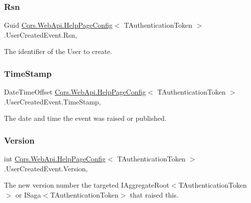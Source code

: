 \subsubsection{\texorpdfstring{Rsn}{Rsn}}
{\footnotesize\ttfamily Guid \hyperlink{classCqrs_1_1WebApi_1_1HelpPageConfig}{Cqrs.\+Web\+Api.\+Help\+Page\+Config}$<$ T\+Authentication\+Token $>$.User\+Created\+Event.\+Rsn\hspace{0.3cm}{\ttfamily [get]}, {\ttfamily [set]}}



The identifier of the User to create. 

\mbox{\label{classCqrs_1_1WebApi_1_1HelpPageConfig_1_1UserCreatedEvent_a413c824200dd34f9a0329641fbea731d_a413c824200dd34f9a0329641fbea731d}} 
\subsubsection{\texorpdfstring{Time\+Stamp}{TimeStamp}}
{\footnotesize\ttfamily Date\+Time\+Offset \hyperlink{classCqrs_1_1WebApi_1_1HelpPageConfig}{Cqrs.\+Web\+Api.\+Help\+Page\+Config}$<$ T\+Authentication\+Token $>$.User\+Created\+Event.\+Time\+Stamp\hspace{0.3cm}{\ttfamily [get]}, {\ttfamily [set]}}



The date and time the event was raised or published. 

\mbox{\label{classCqrs_1_1WebApi_1_1HelpPageConfig_1_1UserCreatedEvent_ac58e3523e24fb4c936146839e4a717a9_ac58e3523e24fb4c936146839e4a717a9}} 
\subsubsection{\texorpdfstring{Version}{Version}}
{\footnotesize\ttfamily int \hyperlink{classCqrs_1_1WebApi_1_1HelpPageConfig}{Cqrs.\+Web\+Api.\+Help\+Page\+Config}$<$ T\+Authentication\+Token $>$.User\+Created\+Event.\+Version\hspace{0.3cm}{\ttfamily [get]}, {\ttfamily [set]}}



The new version number the targeted I\+Aggregate\+Root$<$\+T\+Authentication\+Token$>$ or I\+Saga$<$\+T\+Authentication\+Token$>$ that raised this. 

